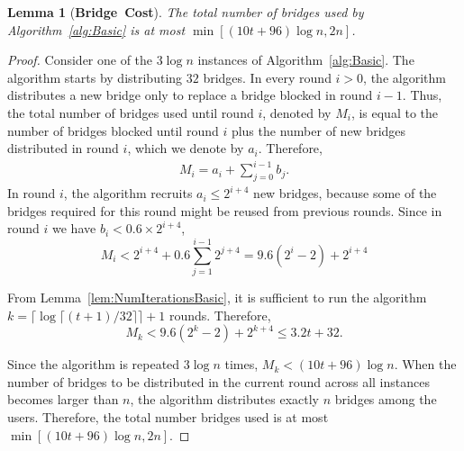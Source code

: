 \documentclass[letterpaper,twocolumn,10pt]{article}
\newtheorem{lemma}{Lemma}
\newcommand{\sfsize}{\fontsize{0.73\baselineskip}{0.73\baselineskip}\selectfont}
\newcommand{\sans}[1]{\textsf{\sfsize \mbox{#1}}}
\newcommand{\sansb}[1]{\textbf{\sans{\mbox{#1}}}}
\begin{document}
\begin{lemma}[\sansb{Bridge Cost}] \label{lem:NumBridgesBasic}
	The total number of bridges used by Algorithm~\ref{alg:Basic} is at most $\min\left[{(10t + 96)\log{n}}, 2n\right]$. %
\end{lemma}
\begin{proof}
	Consider one of the $3\log{n}$ instances of Algorithm~\ref{alg:Basic}. The algorithm starts by distributing  $32$ bridges. In every round ${i > 0}$, the algorithm distributes a new bridge only to replace a bridge blocked in round ${i-1}$. Thus, the total number of bridges used until round $i$, denoted by $M_i$, is equal to the number of bridges blocked until round $i$ plus the number of new bridges distributed in round $i$, which we denote by $a_i$. Therefore,
	\begin{align}
	M_i = a_i + \sum_{j=0}^{i-1} b_j. \label{eq:NumBridges}
	\end{align}
	In round $i$, the algorithm recruits ${a_i \leq 2^{i+4}}$ new bridges, because some of the bridges required for this round might be reused from previous rounds. Since in round $i$ we have ${b_i < 0.6 \times 2^{i+4}}$,
	\[M_i < 2^{i+4} + 0.6\sum_{j=1}^{i-1} 2^{j+4} = 9.6(2^i - 2) + 2^{i+4}\]
	
	From Lemma~\ref{lem:NumIterationsBasic}, it is sufficient to run the algorithm ${k = \lceil \log{\lceil (t+1)/32 \rceil} \rceil + 1}$ rounds. Therefore,	
	\[M_k < 9.6(2^k - 2) + 2^{k+4} \leq 3.2t + 32.\]
	
	Since the algorithm is repeated $3\log{n}$ times, ${M_k < {(10t + 96)\log{n}}}$. When the number of bridges to be distributed in the current round across all instances becomes larger than $n$, the algorithm distributes exactly $n$ bridges among the users. Therefore, the total number bridges used is at most $\min\left[{(10t + 96)\log{n}}, 2n\right]$. %
\end{proof}
\end{document}
